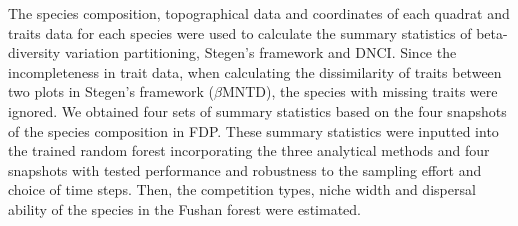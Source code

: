 The species composition, topographical data and coordinates of each quadrat and traits data for each species were used to calculate the summary statistics of beta-diversity variation partitioning, Stegen's framework and DNCI. Since the incompleteness in trait data, when calculating the dissimilarity of traits between two plots in Stegen's framework ($\beta$MNTD), the species with missing traits were ignored. We obtained four sets of summary statistics based on the four snapshots of the species composition in FDP. These summary statistics were inputted into the trained random forest incorporating the three analytical methods and four snapshots with tested performance and robustness to the sampling effort and choice of time steps. Then, the competition types, niche width and dispersal ability of the species in the Fushan forest were estimated.
